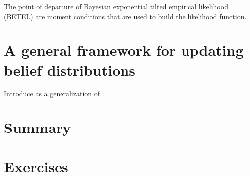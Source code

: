 The point of departure of Bayesian exponential tilted empirical likelihood (BETEL) are moment conditions that are used to build the likelihood function.

\section{A general framework for updating belief distributions}\label{sec12_9}
Introduce \cite{bissiri2016general} as a generalization of \cite{chernozhukov2003mcmc}.



\section{Summary}

\section{Exercises}

